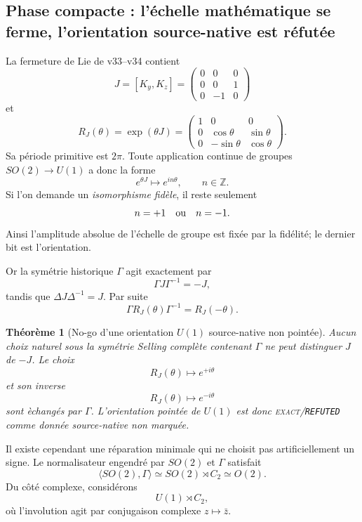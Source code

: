 \documentclass[11pt,a4paper]{article}
\newtheorem{theorem}{Théorème}[section]
\newcommand{\statusExact}{\textsc{exact}}
\newcommand{\certRefuted}{\texttt{REFUTED}}
\begin{document}
\subsection{Phase compacte : l'\'echelle math\'ematique se ferme, l'orientation source-native est r\'efut\'ee}

La fermeture de Lie de v33--v34 contient
\[
 J=[K_y,K_z]=
 \begin{pmatrix}
 0&0&0\\0&0&1\\0&-1&0
 \end{pmatrix}
\]
et
\[
 R_J(\theta)=\exp(\theta J)=
 \begin{pmatrix}
 1&0&0\\
 0&\cos\theta&\sin\theta\\
 0&-\sin\theta&\cos\theta
 \end{pmatrix}.
\]
Sa p\'eriode primitive est $2\pi$. Toute application continue de groupes
$SO(2)\to U(1)$ a donc la forme
\[
 e^{\theta J}\longmapsto e^{in\theta},\qquad n\in\mathbb Z.
\]
Si l'on demande un \emph{isomorphisme fid\`ele}, il reste seulement
\[
 n=+1\quad\hbox{ou}\quad n=-1.
\]
Ainsi l'amplitude absolue de l'\'echelle de groupe est fix\'ee par la fid\'elit\'e; le dernier bit est
l'orientation.

Or la sym\'etrie historique $\Gamma$ agit exactement par
\begin{equation}\label{eq:v35-Gamma-J}
 \boxed{\Gamma J\Gamma^{-1}=-J,}
\end{equation}
tandis que $\Delta J\Delta^{-1}=J$. Par suite
\[
 \Gamma R_J(\theta)\Gamma^{-1}=R_J(-\theta).
\]

\begin{theorem}[No-go d'une orientation $U(1)$ source-native non point\'ee]\label{thm:v35-phase-orientation-nogo}
Aucun choix naturel sous la sym\'etrie Selling compl\`ete contenant $\Gamma$ ne peut distinguer
$J$ de $-J$. Le choix
\[
 R_J(\theta)\mapsto e^{+i\theta}
\]
et son inverse
\[
 R_J(\theta)\mapsto e^{-i\theta}
\]
sont \`echang\'es par $\Gamma$. L'orientation point\'ee de $U(1)$ est donc
\statusExact{}/\certRefuted{} comme donn\'ee source-native non marqu\'ee.
\end{theorem}

Il existe cependant une r\'eparation minimale qui ne choisit pas artificiellement un signe. Le
normalisateur engendr\'e par $SO(2)$ et $\Gamma$ satisfait
\[
 \langle SO(2),\Gamma\rangle\simeq SO(2)\rtimes C_2\simeq O(2).
\]
Du c\^ot\'e complexe, consid\'erons
\[
 U(1)\rtimes C_2,
\]
o\`u l'involution agit par conjugaison complexe $z\mapsto\bar z$.
\end{document}
